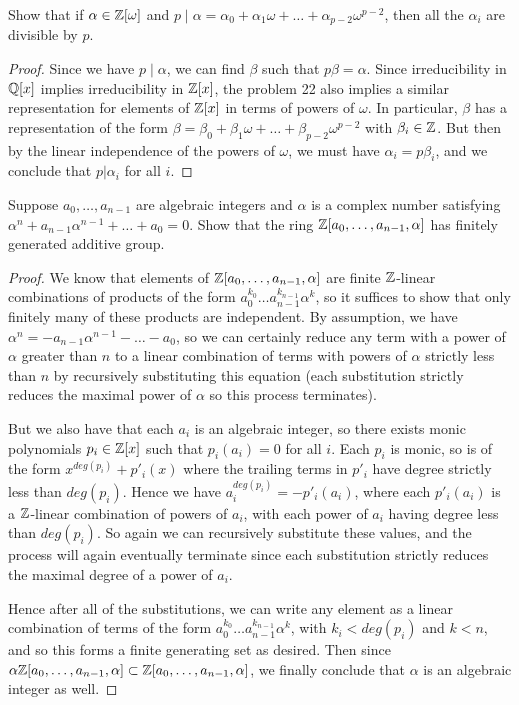 \documentclass[11pt]{article}
\begin{document}
  
Show that if $\alpha \in \mathbb{Z}[\omega]$ and $p \mid \alpha = \alpha_0 + \alpha_1\omega + \dots + \alpha_{p-2}\omega^{p-2}$, then all the $\alpha_i$ are divisible by $p$.

\begin{proof}
  Since we have $p \mid \alpha$, we can find $\beta$ such that $p\beta = \alpha$.
  Since irreducibility in $\mathbb{Q}[x]$ implies irreducibility in $\mathbb{Z}[x]$, the problem 22 also implies a similar representation for elements of $\mathbb{Z}[x]$ in terms of powers of $\omega$.
  In particular, $\beta$ has a representation of the form $\beta = \beta_0 + \beta_1\omega + \dots + \beta_{p-2}\omega^{p-2}$ with $\beta_i \in \mathbb{Z}$.
  But then by the linear independence of the powers of $\omega$, we must have $\alpha_i = p\beta_i$, and we conclude that $p | \alpha_i$ for all $i$.
\end{proof}

Suppose $a_0, \dots, a_{n-1}$ are algebraic integers and $\alpha$ is a complex number satisfying $\alpha^n + a_{n-1}\alpha^{n-1} + \dots + a_0 = 0$. Show that the ring $\mathbb{Z}[a_0, \dots, a_{n-1}, \alpha]$ has finitely generated additive group.

\begin{proof}
  We know that elements of $\mathbb{Z}[a_0, \dots, a_{n-1}, \alpha]$ are finite $\mathbb{Z}$-linear combinations of products of the form $a_0^{k_0} \dots a_{n-1}^{k_{n-1}} \alpha^k$, so it suffices to show that only finitely many of these products are independent.
  By assumption, we have $\alpha^n = -a_{n-1}\alpha^{n-1} - \dots - a_0$, so we can certainly reduce any term with a power of $\alpha$ greater than $n$ to a linear combination of terms with powers of $\alpha$ strictly less than $n$ by recursively substituting this equation (each substitution strictly reduces the maximal power of $\alpha$ so this process terminates).

  But we also have that each $a_i$ is an algebraic integer, so there exists monic polynomials $p_i \in \mathbb{Z}[x]$ such that $p_i(a_i) = 0$ for all $i$.
  Each $p_i$ is monic, so is of the form $x^{deg(p_i)} + p'_i(x)$ where the trailing terms in $p'_i$ have degree strictly less than $deg(p_i)$.
  Hence we have $a_i^{deg(p_i)} = - p'_i(a_i)$, where each $p'_i(a_i)$ is a $\mathbb{Z}$-linear combination of powers of $a_i$, with each power of $a_i$ having degree less than $deg(p_i)$.
  So again we can recursively substitute these values, and the process will again eventually terminate since each substitution strictly reduces the maximal degree of a power of $a_i$.

  Hence after all of the substitutions, we can write any element as a linear combination of terms of the form $a_0^{k_0} \dots a_{n-1}^{k_{n-1}} \alpha^k$, with $k_i < deg(p_i)$ and $k < n$, and so this forms a finite generating set as desired.
  Then since $\alpha \mathbb{Z}[a_0, \dots, a_{n-1}, \alpha] \subset \mathbb{Z}[a_0, \dots, a_{n-1}, \alpha]$, we finally conclude that $\alpha$ is an algebraic integer as well.
\end{proof}
\end{document}
